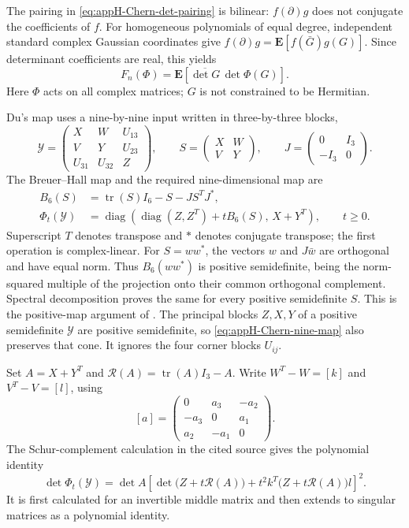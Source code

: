 The pairing in \eqref{eq:appH-Chern-det-pairing} is bilinear:
$f(\partial)g$ does not conjugate the coefficients of $f$.
For homogeneous polynomials of equal degree, independent standard
complex Gaussian coordinates give
$f(\partial)g=\mathbf E[f(\bar G)g(G)]$. Since determinant
coefficients are real, this yields
\[
 F_n(\Phi)=\mathbf E\!\left[
             \overline{\det G}\,\det\Phi(G)\right].
\]
Here $\Phi$ acts on all complex matrices; $G$ is not constrained to
be Hermitian.

Du's map uses a nine-by-nine input written in three-by-three blocks,
\[
 \mathcal Y=
 \begin{pmatrix}X&W&U_{13}\\V&Y&U_{23}\\U_{31}&U_{32}&Z\end{pmatrix},
 \qquad S=\begin{pmatrix}X&W\\V&Y\end{pmatrix},
 \qquad J=\begin{pmatrix}0&I_3\\-I_3&0\end{pmatrix}.
\]
The Breuer--Hall map and the required nine-dimensional map are
\begin{equation*}
 \begin{aligned}
 B_6(S)&=\operatorname{tr}(S)I_6-S-JS^T J^*,\\
 \Phi_t(\mathcal Y)
   &=\operatorname{diag}\!\left(
        \operatorname{diag}(Z,Z^T)+tB_6(S),\,X+Y^T\right),
        \qquad t\geq0 .
 \end{aligned}
 \tag{H.29}\label{eq:appH-Chern-nine-map}
\end{equation*}
Superscript $T$ denotes transpose and $*$ denotes conjugate transpose;
the first operation is complex-linear. For $S=ww^*$, the vectors
$w$ and $J\bar w$ are orthogonal and have equal norm. Thus $B_6(ww^*)$
is positive semidefinite, being the norm-squared multiple of the
projection onto their common orthogonal complement. Spectral
decomposition proves the same for every positive semidefinite $S$.
This is the positive-map argument of
\cite[Theorem~4; actual pp.~8--9]{Hall06PositiveMapsV1}.
The principal blocks $Z,X,Y$ of a positive semidefinite $\mathcal Y$
are positive semidefinite, so \eqref{eq:appH-Chern-nine-map} also
preserves that cone. It ignores the four corner blocks $U_{ij}$.

Set $A=X+Y^T$ and $\mathcal R(A)=\operatorname{tr}(A)I_3-A$.
Write $W^T-W=[k]$ and $V^T-V=[l]$, using
\[
 [a]=
 \begin{pmatrix}0&a_3&-a_2\\-a_3&0&a_1\\a_2&-a_1&0\end{pmatrix}.
\]
The Schur-complement calculation in the cited source gives the
polynomial identity
\begin{equation*}
 \det\Phi_t(\mathcal Y)=
 \det A\left[
       \det\bigl(Z+t\mathcal R(A)\bigr)
       +t^2 k^T\bigl(Z+t\mathcal R(A)\bigr)l\right]^2.
 \tag{H.30}\label{eq:appH-Chern-block-determinant}
\end{equation*}
It is first calculated for an invertible middle matrix and then
extends to singular matrices as a polynomial identity.

